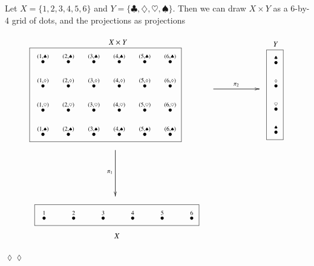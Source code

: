 \documentclass{book}
\newcommand{\LMO}[1]{\stackrel{#1}{\bullet}}
\theoremstyle{theoremENG}
\theoremstyle{lemmaENG}
\theoremstyle{propositionENG}
\theoremstyle{corollaryENG}
\theoremstyle{factENG}
\theoremstyle{remarkENG}
\theoremstyle{exampleENG}
\newtheorem{exampleENG}[subsubsection]{\begin{english}Example\end{english}}
\theoremstyle{warningENG}
\theoremstyle{questionENG}
\theoremstyle{guessENG}
\theoremstyle{answerENG}
\theoremstyle{constructionENG}
\theoremstyle{rulesENG}
\theoremstyle{excENG}
\theoremstyle{appENG}
\newtheorem{appENG}[subsubsection]{\begin{english}Application\end{english}}
\theoremstyle{definitionENG}
\theoremstyle{notationENG}
\theoremstyle{conjectureENG}
\theoremstyle{postulateENG}
\newenvironment{applicationENG}{\begin{appENG}}{\hspace*{\fill}$\lozenge\lozenge$\end{appENG}}
\theoremstyle{theoremRUS}
\theoremstyle{lemmaRUS}
\theoremstyle{propositionRUS}
\theoremstyle{corollaryRUS}
\theoremstyle{factRUS}
\theoremstyle{remarkRUS}
\theoremstyle{exampleRUS}
\theoremstyle{warningRUS}
\theoremstyle{questionRUS}
\theoremstyle{guessRUS}
\theoremstyle{answerRUS}
\theoremstyle{constructionRUS}
\theoremstyle{rulesRUS}
\theoremstyle{excRUS}
\theoremstyle{appRUS}
\theoremstyle{definitionRUS}
\theoremstyle{notationRUS}
\theoremstyle{conjectureRUS}
\theoremstyle{postulateRUS}
\begin{document}
\begin{english}
\begin{exampleENG}
Let $X=\{1,2,3,4,5,6\}$ and $Y=\{\clubsuit,\diamondsuit,\heartsuit,\spadesuit\}$. Then we can draw $X\times Y$ as a 6-by-4 grid of dots, and the projections as projections
\begin{align}
\parbox{2.9in}{\begin{center}\small $X\times Y$\vspace{-.1in}\end{center}\fbox{
\xymatrix@=10pt{
\LMO{(1,\clubsuit)}&\LMO{(2,\clubsuit)}&\LMO{(3,\clubsuit)}&\LMO{(4,\clubsuit)}&\LMO{(5,\clubsuit)}&\LMO{(6,\clubsuit)}\\
\LMO{(1,\diamondsuit)}&\LMO{(2,\diamondsuit)}&\LMO{(3,\diamondsuit)}&\LMO{(4,\diamondsuit)}&\LMO{(5,\diamondsuit)}&\LMO{(6,\diamondsuit)}\\
\LMO{(1,\heartsuit)}&\LMO{(2,\heartsuit)}&\LMO{(3,\heartsuit)}&\LMO{(4,\heartsuit)}&\LMO{(5,\heartsuit)}&\LMO{(6,\heartsuit)}\\
\LMO{(1,\spadesuit)}&\LMO{(2,\spadesuit)}&\LMO{(3,\spadesuit)}&\LMO{(4,\spadesuit)}&\LMO{(5,\spadesuit)}&\LMO{(6,\spadesuit)}\\
}}}
\parbox{.9in}{
\xymatrix{~\ar[rr]^{\pi_2}&&~}
}
\parbox{.3in}{\begin{center}\small $Y$\vspace{-.1in}\end{center}\fbox{
\xymatrix@=10pt{
\LMO{\clubsuit}\\\LMO{\diamondsuit}\\\LMO{\heartsuit}\\\LMO{\spadesuit}
}}}
\\\nonumber
\parbox{1in}{\hspace{-1.95in}\xymatrix{~\ar[dd]_{\pi_1}\\\\~}}
\\\nonumber
\parbox{2.9in}{\hspace{-1.2in}\fbox{
\xymatrix@=24pt{
\LMO{1}&\LMO{2}&\LMO{3}&\LMO{4}&\LMO{5}&\LMO{6}
}}\begin{center}\hspace{-2.6in}\small$X$\end{center}}
\end{align}

\begin{russian} \end{russian}

\end{exampleENG}

\begin{applicationENG}


\end{applicationENG}
\end{english}
\end{document}
